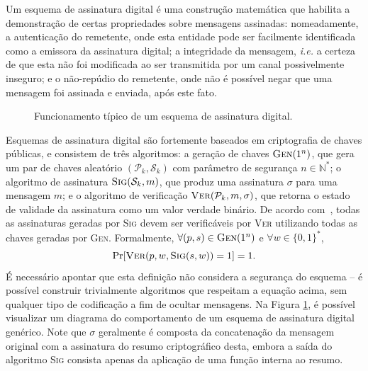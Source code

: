 \documentclass[12pt,notitlepage]{report}
\newcommand{\pk}{\mathcal{P}_k}
\newcommand{\sk}{\mathcal{S}_k}
\newcommand{\binwds}[1]{\{0, 1\}^{#1}}
\begin{document}
Um esquema de assinatura digital é uma construção matemática que habilita a
demonstração de certas propriedades sobre mensagens assinadas: nomeadamente, a
autenticação do remetente, onde esta entidade pode ser facilmente identificada
como a emissora da assinatura digital; a integridade da mensagem, \emph{i.e.} a
certeza de que esta não foi modificada ao ser transmitida por um canal
possivelmente inseguro; e o não-repúdio do remetente, onde não é possível negar
que uma mensagem foi assinada e enviada, após este fato.

\begin{figure}[ht]
  \centering
  \caption{Funcionamento típico de um esquema de assinatura digital.}
  \label{fig:2}
\end{figure}

Esquemas de assinatura digital são fortemente baseados em criptografia de
chaves públicas, e consistem de três algoritmos: a geração de chaves
$\textsc{Gen}(1^n)$, que gera um par de chaves aleatório $(\mathcal{P}_k,
\mathcal{S}_k)$ com parâmetro de segurança $n \in \mathbb{N}^{*}$; o algoritmo
de assinatura $\textsc{Sig}(\mathcal{S}_k, m)$, que produz uma assinatura
$\sigma$ para uma mensagem $m$; e o algoritmo de verificação
$\textsc{Ver}(\mathcal{P}_k, m, \sigma)$, que retorna o estado de validade da
assinatura como um valor verdade binário. De acordo
com~\cite{Goldreich:2004:FCV:975541}, todas as assinaturas geradas por
\textsc{Sig} devem ser verificáveis por \textsc{Ver} utilizando todas as chaves
geradas por \textsc{Gen}. Formalmente, $\forall (p, s) \in \textsc{Gen}(1^n)$ e
$\forall w \in \binwds{*}$,
\begin{equation}
    \text{Pr}[\textsc{Ver}(p, w, \textsc{Sig}(s, w)) = 1] = 1.
\end{equation}
É necessário apontar que esta definição não considera a segurança do esquema --
é possível construir trivialmente algoritmos que respeitam a equação acima, sem
qualquer tipo de codificação a fim de ocultar mensagens.  Na Figura
\ref{fig:2}, é possível visualizar um diagrama do comportamento de um esquema
de assinatura digital genérico. Note que $\sigma$ geralmente é composta da
concatenação da mensagem original com a assinatura do resumo criptográfico
desta, embora a saída do algoritmo \textsc{Sig} consista apenas da aplicação de
uma função interna ao resumo.
\end{document}
